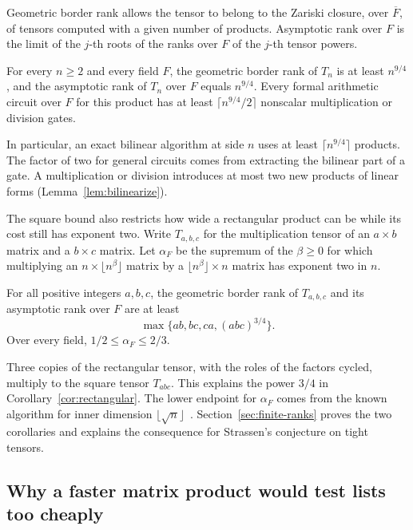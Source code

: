 Geometric border rank allows the tensor to belong to the Zariski closure,
over \(\overline F\), of tensors computed with a given number of products.
Asymptotic rank over \(F\) is the limit of the \(j\)-th roots of the
ranks over \(F\) of the \(j\)-th tensor powers.

\begin{corollary}\label{cor:tight}
For every \(n\ge2\) and every field \(F\), the geometric border rank of
\(T_n\) is at least \(n^{9/4}\), and the asymptotic rank of \(T_n\) over
\(F\) equals \(n^{9/4}\). Every formal arithmetic circuit over \(F\)
for this product has at least \(\lceil n^{9/4}/2\rceil\) nonscalar
multiplication or division gates.
\end{corollary}

In particular, an exact bilinear algorithm at side \(n\) uses at least
\(\lceil n^{9/4}\rceil\) products. The factor of two for general circuits
comes from extracting the bilinear part of a gate. A multiplication
or division introduces at most two new products of linear forms
(Lemma~\ref{lem:bilinearize}).

The square bound also restricts how wide a rectangular product can be
while its cost still has exponent two. Write \(T_{a,b,c}\) for the
multiplication tensor of an \(a\times b\) matrix and a \(b\times c\)
matrix. Let \(\alpha_F\) be the supremum of the \(\beta\ge0\) for which
multiplying an \(n\times\lfloor n^\beta\rfloor\) matrix by a
\(\lfloor n^\beta\rfloor\times n\) matrix has exponent two in \(n\).

\begin{corollary}\label{cor:rectangular}
For all positive integers \(a,b,c\), the geometric border rank of
\(T_{a,b,c}\) and its asymptotic rank over \(F\) are at least
\[
              \max\{ab,bc,ca,(abc)^{3/4}\}.
\]
Over every field, \(1/2\le\alpha_F\le2/3\).
\end{corollary}

Three copies of the rectangular tensor, with the roles of the factors
cycled, multiply to the square tensor \(T_{abc}\). This explains the
power \(3/4\) in Corollary~\ref{cor:rectangular}. The lower endpoint for
\(\alpha_F\) comes from the known algorithm for inner dimension
\(\lfloor\sqrt n\rfloor\)~\cite{uznanski,abvz}. Section~\ref{sec:finite-ranks}
proves the two corollaries and explains the consequence for Strassen's
conjecture on tight tensors.

\subsection{Why a faster matrix product would test lists too cheaply}

